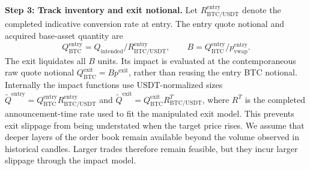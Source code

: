 \documentclass{ieeeaccess}
\begin{document}
\textbf{Step 3: Track inventory and exit notional.} Let $R^{\mathrm{entry}}_{\mathrm{BTC/USDT}}$ denote the completed indicative conversion rate at entry. The entry quote notional and acquired base-asset quantity are
\begin{equation}
    Q^{\mathrm{entry}}_{\mathrm{BTC}}
      = Q_{\mathrm{intended}}/R^{\mathrm{entry}}_{\mathrm{BTC/USDT}},
    \qquad
    B = Q^{\mathrm{entry}}_{\mathrm{BTC}}/p^{\mathrm{entry}}_{\mathrm{vwap}}.
\end{equation}
The exit liquidates all $B$ units. Its impact is evaluated at the contemporaneous raw quote notional $Q^{\mathrm{exit}}_{\mathrm{BTC}}=B p^{\mathrm{exit}}$, rather than reusing the entry BTC notional. Internally the impact functions use USDT-normalized sizes $\widetilde Q^{\mathrm{entry}}=Q^{\mathrm{entry}}_{\mathrm{BTC}}R^{\mathrm{entry}}_{\mathrm{BTC/USDT}}$ and $\widetilde Q^{\mathrm{exit}}=Q^{\mathrm{exit}}_{\mathrm{BTC}}R^{T}_{\mathrm{BTC/USDT}}$, where $R^{T}$ is the completed announcement-time rate used to fit the manipulated exit model. This prevents exit slippage from being understated when the target price rises. We assume that deeper layers of the order book remain available beyond the volume observed in historical candles. Larger trades therefore remain feasible, but they incur larger slippage through the impact model.
\end{document}
